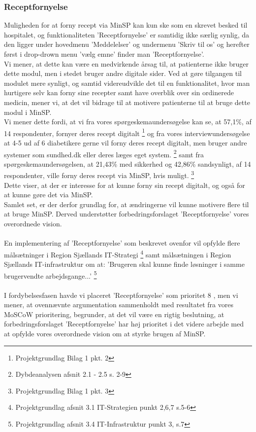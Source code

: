 \subsubsection{Receptfornyelse}
Muligheden for at forny recept via MinSP kan kun ske som en skrevet besked til hospitalet, og funktionaliteten 'Receptfornyelse' er samtidig ikke særlig synlig, da den ligger under hovedmenu 'Meddelelser' og undermenu 'Skriv til os' og herefter først i drop-drown menu 'vælg emne' finder man 'Receptfornyelse'.\\
Vi mener, at dette kan være en medvirkende årsag til, at patienterne ikke bruger dette modul, men i stedet bruger andre digitale sider. Ved at gøre tilgangen til modulet mere synligt, og samtid videreudvikle det til en funktionalitet, hvor man hurtigere selv kan forny sine recepter samt have overblik over sin ordinerede medicin, mener vi, at det vil bidrage til at motivere patienterne til at bruge dette modul i MinSP.\\
Vi mener dette fordi, at vi fra vores spørgeskemaundersøgelse kan se, at 57,1\%, af 14 respondenter, fornyer deres recept digitalt \footnote{Projektgrundlag Bilag 1 pkt. 2} og fra vores interviewundersøgelse at 4-5 ud af 6 diabetikere gerne vil forny deres recept digitalt, men bruger andre systemer som sundhed.dk eller deres læges eget system. \footnote{Dybdeanalysen afsnit 2.1 - 2.5 s. 2-9} samt fra spørgeskemaundersøgelsen, at 21,43\% med sikkerhed og 42,86\% sandsynligt, af 14 respondenter, ville forny deres recept via MinSP, hvis muligt. \footnote{Projektgrundlag Bilag 1 pkt. 3}  \\
Dette viser, at der er interesse for at kunne forny sin recept digitalt, og også for at kunne gøre det via MinSP.\\
Samlet set, er der derfor grundlag for, at ændringerne vil kunne motivere flere til at bruge MinSP. Derved understøtter forbedringsforslaget 'Receptfornyelse' vores overordnede vision.\\
\\
En implementering af 'Receptfornyelse' som beskrevet ovenfor vil opfylde flere målsætninger i Region Sjællands IT-Strategi \footnote{Projektgrundlag afsnit 3.1 IT-Strategien punkt 2,6,7 s.5-6} samt målsætningen i Region Sjællands IT-infrastruktur om at: 'Brugeren skal kunne finde løsninger i samme brugervendte arbejdsgange...' \footnote{Projektgrundlag afsnit 3.4 IT-Infrastruktur punkt 3, s.7}\\
\\
I fordybelsesfasen havde vi placeret 'Receptfornyelse' som prioritet 8%
, men vi mener, at ovennævnte argumentation sammenholdt med resultatet fra vores MoSCoW prioritering, begrunder, at det vil være en rigtig beslutning, at %
forbedringsforslaget 'Receptfornyelse' har høj prioritet i det videre arbejde med at opfylde vores overordnede vision om at styrke brugen af MinSP.
